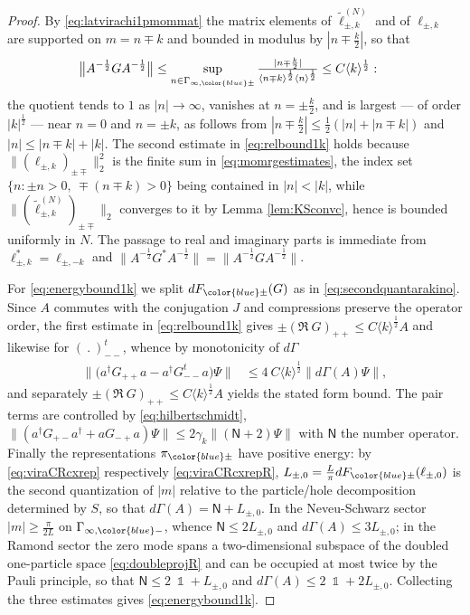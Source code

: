 \documentclass[a4paper, 11pt]{article}
\DeclareMathOperator{\1}{\mathds{1}}
\newcommand{\Nop}{\mathsf{N}}
\begin{document}
\begin{proof}
By \eqref{eq:latvirachi1pmommat} the matrix elements of $\tilde{\ell}^{(N)}_{\pm,k}$ and of $\ell_{\pm,k}$ are supported on $m=n\mp k$ and bounded in modulus by $|n\mp\tfrac{k}{2}|$, so that
\begin{align*}
\big\|A^{-\frac{1}{2}}GA^{-\frac{1}{2}}\big\| & \leq \sup_{n\in\Gamma_{\infty,{\color{blue}\pm}}}\tfrac{|n\mp\frac{k}{2}|}{\langle n\mp k\rangle^{\frac{1}{2}}\langle n\rangle^{\frac{1}{2}}} \leq C\langle k\rangle^{\frac{1}{2}}:
\end{align*}
the quotient tends to $1$ as $|n|\rightarrow\infty$, vanishes at $n=\pm\tfrac{k}{2}$, and is largest --- of order $|k|^{\frac{1}{2}}$ --- near $n=0$ and $n=\pm k$, as follows from $|n\mp\tfrac{k}{2}|\leq\tfrac{1}{2}(|n|+|n\mp k|)$ and $|n|\leq|n\mp k|+|k|$. The second estimate in \eqref{eq:relbound1k} holds because $\|(\ell_{\pm,k})_{\pm\mp}\|_{2}^{2}$ is the finite sum in \eqref{eq:momrgestimates}, the index set $\{n:\pm n>0,\ \mp(n\mp k)>0\}$ being contained in $|n|<|k|$, while $\|(\tilde{\ell}^{(N)}_{\pm,k})_{\pm\mp}\|_{2}$ converges to it by Lemma \ref{lem:KSconvc}, hence is bounded uniformly in $N$. The passage to real and imaginary parts is immediate from $\ell^{*}_{\pm,k}=\ell_{\pm,-k}$ and $\|A^{-\frac{1}{2}}G^{*}A^{-\frac{1}{2}}\| = \|A^{-\frac{1}{2}}GA^{-\frac{1}{2}}\|$.

For \eqref{eq:energybound1k} we split $dF_{{\color{blue}\pm}}(G)$ as in \eqref{eq:secondquantarakino}. Since $A$ commutes with the conjugation $J$ and compressions preserve the operator order, the first estimate in \eqref{eq:relbound1k} gives $\pm(\Re\!\ G)_{++}\leq C\langle k\rangle^{\frac{1}{2}}A$ and likewise for $(\!\ .\!\ )^{t}_{--}$, whence by monotonicity of $d\Gamma$
\begin{align*}
\big\|\big(a^{\dag}G_{++}a-a^{\dag}G^{t}_{--}a\big)\Psi\big\| & \leq 4\!\ C\langle k\rangle^{\frac{1}{2}}\big\|d\Gamma(A)\Psi\big\|,
\end{align*}
and separately $\pm(\Re\!\ G)_{++}\leq C\langle k\rangle^{\frac12}A$ yields the stated form bound. The pair terms are controlled by \eqref{eq:hilbertschmidt}, $\|(a^{\dag}G_{+-}a^{\dag}+aG_{-+}a)\Psi\|\leq2\gamma_{k}\|(\Nop+2)\Psi\|$ with $\Nop$ the number operator. Finally the representations $\pi_{{\color{blue}\pm}}$ have positive energy: by \eqref{eq:viraCRcxrep} respectively \eqref{eq:viraCRcxrepR}, $L_{\pm,0}=\tfrac{L}{\pi}dF_{{\color{blue}\pm}}(\ell_{\pm,0})$ is the second quantization of $|m|$ relative to the particle/hole decomposition determined by $S$, so that $d\Gamma(A)=\Nop+L_{\pm,0}$. In the Neveu-Schwarz sector $|m|\geq\tfrac{\pi}{2L}$ on $\Gamma_{\infty,{\color{blue}-}}$, whence $\Nop\leq2L_{\pm,0}$ and $d\Gamma(A)\leq3L_{\pm,0}$; in the Ramond sector the zero mode spans a two-dimensional subspace of the doubled one-particle space \eqref{eq:doubleprojR} and can be occupied at most twice by the Pauli principle, so that $\Nop\leq2\!\ \1+L_{\pm,0}$ and $d\Gamma(A)\leq2\!\ \1+2L_{\pm,0}$. Collecting the three estimates gives \eqref{eq:energybound1k}.
\end{proof}
\end{document}
